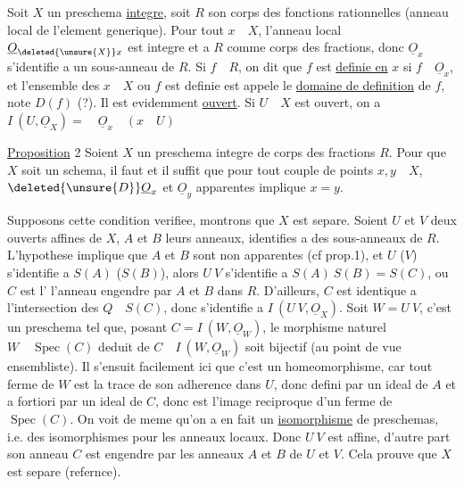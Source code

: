 
Soit \(X\) un preschema \uline{integre}, soit \(R\) son corps des fonctions rationnelles (anneau local de l'element generique). Pour tout \(x\quad X\),  l'anneau local \(\underline O_{\deleted{\unsure{X}}x}\) est integre et a \(R\) comme corps des fractions, donc \(\underline O_x\) s'identifie a un sous-anneau de \(R\). Si \(f\quad R\), on dit que \(f\) est \uline{definie en} \(x\) si \(f\quad\underline O_x\), et l'ensemble des \(x\quad X\) ou \(f\) est definie est appele le \uline{domaine de definition} de \(f\), note \(D(f)\) (?). Il est evidemment \uline{ouvert}. Si \(U\quad X\) est ouvert, on a \(I\ (U,\underline O_X)=\quad\underline O_x\quad(x\quad U)\)

\uline{Proposition} 2 Soient \(X\) un preschema integre de corps des fractions \(R\). Pour que \(X\) soit un schema, il faut et il suffit que pour tout couple de points \(x,y\quad X\), \(\deleted{\unsure{D}}\underline O_x\) et \(\underline O_y\) apparentes implique \(x=y\).

Supposons cette condition verifiee, montrons que \(X\) est separe. Soient \(U\) et \(V\) deux ouverts affines de \(X\), \(A\) et \(B\) leurs anneaux, identifies a des sous-anneaux de \(R\). L'hypothese implique que \(A\) et \(B\) sont non apparentes (cf prop.1),  et \(U\) (\(V\)) s'identifie a \(S(A)\) (\(S(B)\)), alors \(U\ V\) s'identifie a \(S(A)\ S(B)=S(C)\), ou \(C\) est l' l'anneau engendre par \(A\) et \(B\) dans \(R\). D'ailleurs, \(C\) est identique a l'intersection des \(Q\quad S(C)\), donc s'identifie a \(I\ (U\ V,\underline O_X)\). Soit \(W=U\ V\), c'est un preschema tel que, posant \(C=I\ (W,\underline O_W)\), le morphisme naturel \(W\quad\operatorname{Spec}(C)\) deduit de \(C\quad I\ (W,\underline O_W)\) soit bijectif (au point de vue ensembliste). Il s'ensuit facilement ici que c'est un homeomorphisme, car tout ferme de \(W\) est la trace de son adherence dans \(U\), donc defini par un ideal de \(A\) et a fortiori par un ideal de  \(C\), donc est l'image reciproque d'un ferme de \(\operatorname{Spec}(C)\). On voit de meme qu'on a en fait un \uline{isomorphisme} de preschemas, i.e. des isomorphismes pour les anneaux locaux. Donc \(U\ V\) est affine, d'autre part son anneau \(C\) est engendre par les anneaux \(A\) et \(B\) de \(U\) et \(V\). Cela prouve que \(X\) est separe (refernce).

